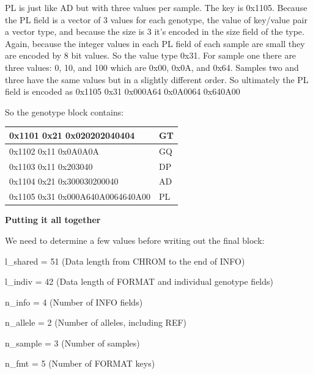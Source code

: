 \documentclass[8pt]{article}
\begin{document}
PL is just like AD but with three values per sample.
The key is 0x1105.
Because the PL field is a vector of 3 values for each genotype, the value of key/value pair a vector type, and because the size is 3 it's encoded in the size field of the type.
Again, because the integer values in each PL field of each sample are small they are encoded by 8 bit values.
So the value type 0x31.
For sample one there are three values: 0, 10, and 100 which are 0x00, 0x0A, and 0x64.
Samples two and three have the same values but in a slightly different order.
So ultimately the PL field is encoded as 0x1105 0x31 0x000A64 0x0A0064 0x640A00

So the genotype block contains:

\vspace{0.3cm}
\begin{tabular}{|l| l|} \hline
0x1101 0x21 0x020202040404 & GT \\ \hline
0x1102 0x11 0x0A0A0A & GQ \\ \hline
0x1103 0x11 0x203040 & DP \\ \hline
0x1104 0x21 0x300030200040 & AD \\ \hline
0x1105 0x31 0x000A640A0064640A00 & PL \\ \hline
\end{tabular}
\vspace{0.3cm}

\textbf{Putting it all together}

We need to determine a few values before writing out the final block:

l\_shared = 51 (Data length from CHROM to the end of INFO)

l\_indiv = 42 (Data length of FORMAT and individual genotype fields)

n\_info = 4 (Number of INFO fields)

n\_allele = 2 (Number of alleles, including REF)

n\_sample = 3 (Number of samples)

n\_fmt = 5 (Number of FORMAT keys)
\end{document}
